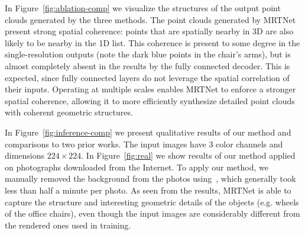 In Figure~\ref{fig:ablation-comp} we visualize the structures of the output point clouds generated by the three methods.
The point clouds generated by MRTNet
present strong spatial coherence: points that are spatially nearby in 3D are also likely to be nearby in the 1D list.
This coherence is present to some degree in the single-resolution outputs (note the dark blue points in the chair's arms), but is almost completely absent in the results by the fully connected decoder. This is expected,
since fully connected layers do not leverage the spatial correlation of their inputs.
Operating at multiple scales enables MRTNet to enforce a stronger spatial coherence, allowing it to more efficiently synthesize detailed point clouds with coherent geometric structures.

 In Figure~\ref{fig:inference-comp} we present qualitative results of our method and comparisons to two prior works. 
The input images have 3 color channels and dimensions $224\times224$. 
In Figure~\ref{fig:real} we show results of our method applied on photographs downloaded from the Internet. 
To apply our method, we manually removed the background from the photos using~\cite{clipmagic}, which generally took less than half a minute per photo. 
As seen from the results, MRTNet is able to capture the structure and interesting geometric details of the objects (e.g. wheels of the office chairs), 
even though the input images are considerably different from the rendered ones used in training.


